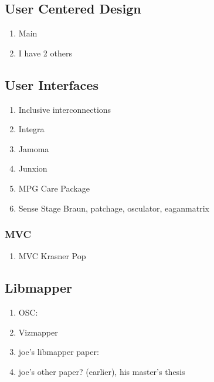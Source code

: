 \subsection{User Centered Design}
	\begin{enumerate}
		\item Main \cite{usd}
		\item I have 2 others
	\end{enumerate}

\subsection{User Interfaces}
	\begin{enumerate}
		\item Inclusive interconnections \cite{inclusiveinterconnections}
		\item Integra \cite{integra}
		\item Jamoma \cite{jamoma}
		\item Junxion \cite{junxion}
		\item MPG Care Package \cite{MPGcarepackage}
		\item Sense Stage \cite{senseStage}
		Braun, patchage, osculator, eaganmatrix
	\end{enumerate}
		\subsubsection{MVC}
			\begin{enumerate}
				\item MVC Krasner Pop \cite{MVC_krasnerpope}
			\end{enumerate}

\subsection{Libmapper}
	\begin{enumerate}
		\item OSC: \cite{osc}
		\item Vizmapper \cite{vizmapper}
		\item joe's libmapper paper: \cite{malloch}
		\item joe's other paper? (earlier), his master's thesis
	\end{enumerate}


